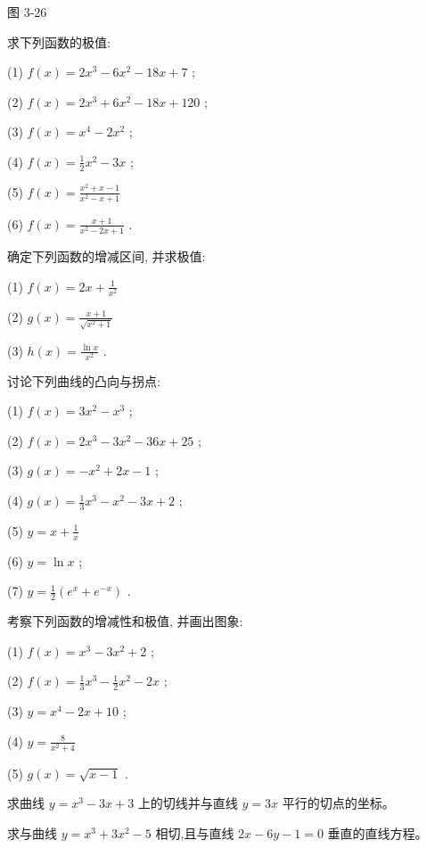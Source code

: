 \documentclass[lang=cn,newtx,12pt,scheme=chinese]{elegantbook}
\begin{document}
图 3-26

\begin{problemset}[习 题 十 二]

\item 求下列函数的极值:

(1) \(f\left( x\right) = 2{x}^{3} - 6{x}^{2} - {18x} + 7\) ;

(2) \(f\left( x\right) = 2{x}^{3} + 6{x}^{2} - {18x} + {120}\) ;

(3) \(f\left( x\right) = {x}^{4} - 2{x}^{2}\) ;

(4) \(f\left( x\right) = \frac{1}{2}{x}^{2} - {3x}\) ;

(5) \(f\left( x\right) = \frac{{x}^{2} + x - 1}{{x}^{2} - x + 1}\)

(6) \(f\left( x\right) = \frac{x + 1}{{x}^{2} - {2x} + 1}\) .

\item 确定下列函数的增减区间, 并求极值:

(1) \(f\left( x\right) = {2x} + \frac{1}{{x}^{2}}\)

(2) \(g\left( x\right) = \frac{x + 1}{\sqrt{{x}^{2} + 1}}\)

(3) \(h\left( x\right) = \frac{\ln x}{{x}^{2}}\) .

\item 讨论下列曲线的凸向与拐点:

(1) \(f\left( x\right) = 3{x}^{2} - {x}^{3}\) ;

(2) \(f\left( x\right) = 2{x}^{3} - 3{x}^{2} - {36x} + {25}\) ;

(3) \(g\left( x\right) = - {x}^{2} + {2x} - 1\) ;

(4) \(g\left( x\right) = \frac{1}{3}{x}^{3} - {x}^{2} - {3x} + 2\) ;

(5) \(y = x + \frac{1}{x}\)

(6) \(y = \ln x\) ;

(7) \(y = \frac{1}{2}\left( {{e}^{x} + {e}^{-x}}\right)\) .

\item 考察下列函数的增减性和极值, 并画出图象:

(1) \(f\left( x\right) = {x}^{3} - 3{x}^{2} + 2\) ;

(2) \(f\left( x\right) = \frac{1}{3}{x}^{3} - \frac{1}{2}{x}^{2} - {2x}\) ;

(3) \(y = {x}^{4} - {2x} + {10}\) ;

(4) \(y = \frac{8}{{x}^{2} + 4}\)

(5) \(g\left( x\right) = \sqrt{x - 1}\) .

\item 求曲线 \(y = {x}^{3} - {3x} + 3\) 上的切线并与直线 \(y = {3x}\) 平行的切点的坐标。

\item 求与曲线 \(y = {x}^{3} + 3{x}^{2} - 5\) 相切,且与直线 \({2x} - {6y} - 1 = 0\) 垂直的直线方程。

\end{problemset}
\end{document}
